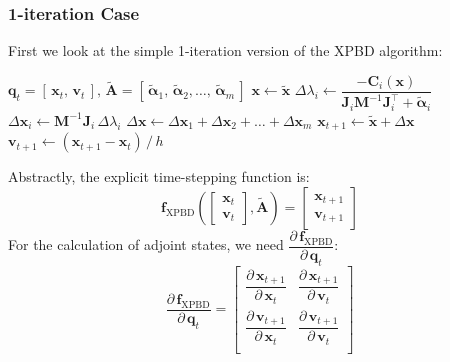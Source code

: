 \documentclass{article}
\newcommand{\pd}[2]{\dfrac{\partial\, #1}{\partial\, #2}}
\begin{document}
\subsubsection{1-iteration Case} 
First we look at the simple 1-iteration version of the XPBD algorithm:
\begin{algorithm}[H]
\caption{XPBD Time Step with 1 Iteration}
\begin{algorithmic}[1]
{$\mathbf{q}_t = [\,\mathbf{x}_t,\, \mathbf{v}_t\,],\, 
\tilde{\mathbf{A}} = [\, \tilde{\boldsymbol{\alpha}}_{1},\, \tilde{\boldsymbol{\alpha}}_{2}, \dots,\, \tilde{\boldsymbol{\alpha}}_{m} \,]$}
    \State $\mathbf{x} \gets \tilde{\mathbf{x}}$
        \State $\Delta\lambda_i \gets 
            \dfrac{-\mathbf{C}_i(\mathbf{x})}
                  {\mathbf{J}_i\mathbf{M}^{-1}\mathbf{J}_i^\top + \tilde{\boldsymbol{\alpha}}_{i}}$
        \State $\Delta \mathbf{x}_i \gets \mathbf{M}^{-1}\mathbf{J}_i\,\Delta\lambda_i$
    \EndFor
    \State $\Delta \mathbf{x} \gets \Delta \mathbf{x}_1 + \Delta \mathbf{x}_2 + \dots + \Delta \mathbf{x}_m$
    \State $\mathbf{x}_{t+1} \gets \tilde{\mathbf{x}} + \Delta \mathbf{x}$
    \State $\mathbf{v}_{t+1} \gets (\mathbf{x}_{t+1} - \mathbf{x}_t) \,/\, h$
\EndFunction
\end{algorithmic}
\end{algorithm}
\noindent Abstractly, the explicit time-stepping function is:
\begin{equation*}
    \mathbf{f}_{\text{XPBD}}\left(
        \begin{bmatrix}
            \mathbf{x}_{t} \\
            \mathbf{v}_{t} 
        \end{bmatrix}, 
        \tilde{\mathbf{A}}
    \right) = 
    \begin{bmatrix}
        \mathbf{x}_{t+1} \\
        \mathbf{v}_{t+1} 
    \end{bmatrix}
\end{equation*}
For the calculation of adjoint states, we need $\pd{\mathbf{f}_{\text{XPBD}}}{\mathbf{q}_t}$:
\begin{equation*}
\pd{\mathbf{f}_{\text{XPBD}}}{\mathbf{q}_t} = 
\begin{bmatrix}
    \pd{\mathbf{x}_{t+1}}{\mathbf{x}_{t}} &\pd{\mathbf{x}_{t+1}}{\mathbf{v}_{t}} \\
    \pd{\mathbf{v}_{t+1}}{\mathbf{x}_{t}} &\pd{\mathbf{v}_{t+1}}{\mathbf{v}_{t}} \\
\end{bmatrix}
\end{equation*}
\end{document}
